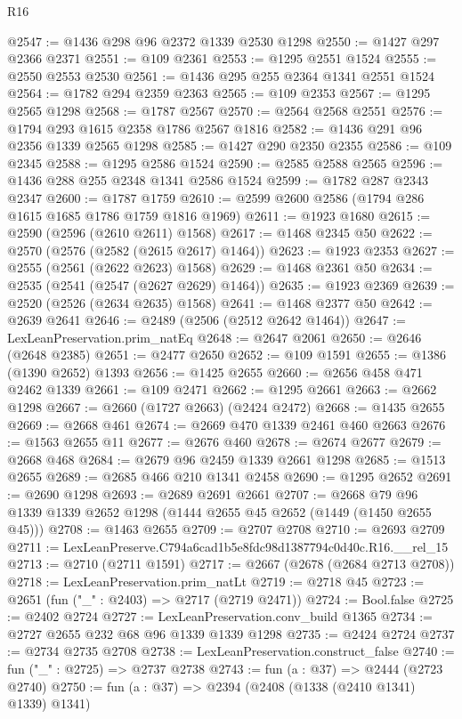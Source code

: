 \begin{lexlean}{R16}
\begin{coremodule}
@2547 := @1436 @298 @96 @2372 @1339 @2530 @1298
@2550 := @1427 @297 @2366 @2371
@2551 := @109 @2361
@2553 := @1295 @2551 @1524
@2555 := @2550 @2553 @2530
@2561 := @1436 @295 @255 @2364 @1341 @2551 @1524
@2564 := @1782 @294 @2359 @2363
@2565 := @109 @2353
@2567 := @1295 @2565 @1298
@2568 := @1787 @2567
@2570 := @2564 @2568 @2551
@2576 := @1794 @293 @1615 @2358 @1786 @2567 @1816
@2582 := @1436 @291 @96 @2356 @1339 @2565 @1298
@2585 := @1427 @290 @2350 @2355
@2586 := @109 @2345
@2588 := @1295 @2586 @1524
@2590 := @2585 @2588 @2565
@2596 := @1436 @288 @255 @2348 @1341 @2586 @1524
@2599 := @1782 @287 @2343 @2347
@2600 := @1787 @1759
@2610 := @2599 @2600 @2586 (@1794 @286 @1615 @1685 @1786 @1759 @1816 @1969)
@2611 := @1923 @1680
@2615 := @2590 (@2596 (@2610 @2611) @1568)
@2617 := @1468 @2345 @50
@2622 := @2570 (@2576 (@2582 (@2615 @2617) @1464))
@2623 := @1923 @2353
@2627 := @2555 (@2561 (@2622 @2623) @1568)
@2629 := @1468 @2361 @50
@2634 := @2535 (@2541 (@2547 (@2627 @2629) @1464))
@2635 := @1923 @2369
@2639 := @2520 (@2526 (@2634 @2635) @1568)
@2641 := @1468 @2377 @50
@2642 := @2639 @2641
@2646 := @2489 (@2506 (@2512 @2642 @1464))
@2647 := LexLeanPreservation.prim_natEq
@2648 := @2647 @2061
@2650 := @2646 (@2648 @2385)
@2651 := @2477 @2650
@2652 := @109 @1591
@2655 := @1386 (@1390 @2652) @1393
@2656 := @1425 @2655
@2660 := @2656 @458 @471 @2462 @1339
@2661 := @109 @2471
@2662 := @1295 @2661
@2663 := @2662 @1298
@2667 := @2660 (@1727 @2663) (@2424 @2472)
@2668 := @1435 @2655
@2669 := @2668 @461
@2674 := @2669 @470 @1339 @2461 @460 @2663
@2676 := @1563 @2655 @11
@2677 := @2676 @460
@2678 := @2674 @2677
@2679 := @2668 @468
@2684 := @2679 @96 @2459 @1339 @2661 @1298
@2685 := @1513 @2655
@2689 := @2685 @466 @210 @1341 @2458
@2690 := @1295 @2652
@2691 := @2690 @1298
@2693 := @2689 @2691 @2661
@2707 := @2668 @79 @96 @1339 @1339 @2652 @1298 (@1444 @2655 @45 @2652 (@1449 (@1450 @2655 @45)))
@2708 := @1463 @2655
@2709 := @2707 @2708
@2710 := @2693 @2709
@2711 := LexLeanPreserve.C794a6cad1b5e8fdc98d1387794c0d40c.R16.__rel_15
@2713 := @2710 (@2711 @1591)
@2717 := @2667 (@2678 (@2684 @2713 @2708))
@2718 := LexLeanPreservation.prim_natLt
@2719 := @2718 @45
@2723 := @2651 (fun ("_" : @2403) => @2717 (@2719 @2471))
@2724 := Bool.false
@2725 := @2402 @2724
@2727 := LexLeanPreservation.conv_build @1365
@2734 := @2727 @2655 @232 @68 @96 @1339 @1339 @1298
@2735 := @2424 @2724
@2737 := @2734 @2735 @2708
@2738 := LexLeanPreservation.construct_false
@2740 := fun ("_" : @2725) => @2737 @2738
@2743 := fun (a : @37) => @2444 (@2723 @2740)
@2750 := fun (a : @37) => @2394 (@2408 (@1338 (@2410 @1341) @1339) @1341)

\end{coremodule}
\end{lexlean}
